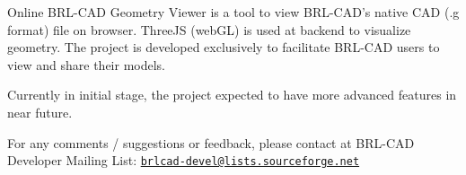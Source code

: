 Online B\-R\-L-\/\-C\-A\-D Geometry Viewer is a tool to view B\-R\-L-\/\-C\-A\-D's native C\-A\-D (.g format) file on browser. Three\-J\-S (web\-G\-L) is used at backend to visualize geometry. The project is developed exclusively to facilitate B\-R\-L-\/\-C\-A\-D users to view and share their models.

Currently in initial stage, the project expected to have more advanced features in near future.

For any comments / suggestions or feedback, please contact at B\-R\-L-\/\-C\-A\-D Developer Mailing List\-: \href{mailto:brlcad-devel@lists.sourceforge.net}{\tt brlcad-\/devel@lists.\-sourceforge.\-net} 